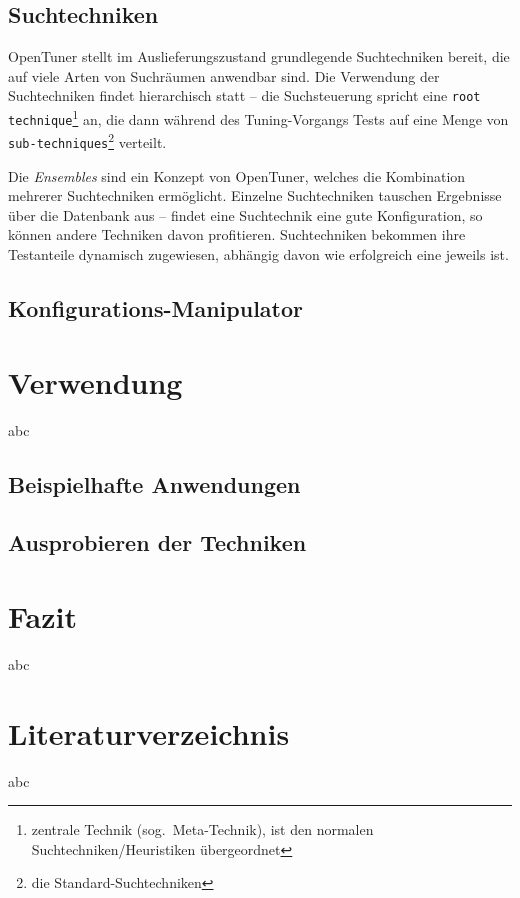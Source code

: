 \documentclass[a4paper,11pt]{scrartcl}
\begin{document}

\subsection{Suchtechniken}
OpenTuner stellt im Auslieferungszustand grundlegende Suchtechniken bereit, die auf viele Arten von 
Suchräumen anwendbar sind. Die Verwendung der Suchtechniken findet hierarchisch statt --
die Suchsteuerung spricht eine \texttt{root technique}\footnote{zentrale Technik (sog.~Meta-Technik),
ist den normalen Suchtechniken/Heuristiken übergeordnet} an, die dann während des Tuning-Vorgangs 
Tests auf eine Menge von \texttt{sub-techniques}\footnote{die Standard-Suchtechniken} verteilt. \newline

Die \emph{Ensembles} sind ein Konzept von OpenTuner, welches die Kombination mehrerer Suchtechniken
ermöglicht. Einzelne Suchtechniken tauschen Ergebnisse über die Datenbank aus -- findet eine 
Suchtechnik eine gute Konfiguration, so können andere Techniken davon profitieren.
Suchtechniken bekommen ihre Testanteile dynamisch zugewiesen, abhängig davon wie erfolgreich eine
jeweils ist.

\subsection{Konfigurations-Manipulator}



\section{Verwendung}
abc
\subsection{Beispielhafte Anwendungen}

\subsection{Ausprobieren der Techniken}

\section{Fazit}
abc

\section{Literaturverzeichnis}
abc
\end{document}
